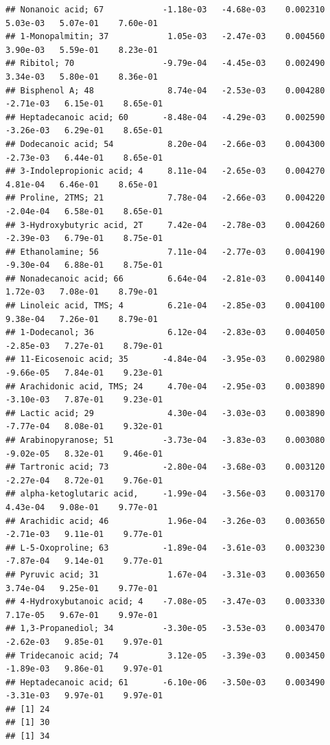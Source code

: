 \documentclass[]{article}
\begin{document}
\begin{verbatim}
## Nonanoic acid; 67            -1.18e-03   -4.68e-03    0.002310    5.03e-03   5.07e-01    7.60e-01
## 1-Monopalmitin; 37            1.05e-03   -2.47e-03    0.004560    3.90e-03   5.59e-01    8.23e-01
## Ribitol; 70                  -9.79e-04   -4.45e-03    0.002490    3.34e-03   5.80e-01    8.36e-01
## Bisphenol A; 48               8.74e-04   -2.53e-03    0.004280   -2.71e-03   6.15e-01    8.65e-01
## Heptadecanoic acid; 60       -8.48e-04   -4.29e-03    0.002590   -3.26e-03   6.29e-01    8.65e-01
## Dodecanoic acid; 54           8.20e-04   -2.66e-03    0.004300   -2.73e-03   6.44e-01    8.65e-01
## 3-Indolepropionic acid; 4     8.11e-04   -2.65e-03    0.004270    4.81e-04   6.46e-01    8.65e-01
## Proline, 2TMS; 21             7.78e-04   -2.66e-03    0.004220   -2.04e-04   6.58e-01    8.65e-01
## 3-Hydroxybutyric acid, 2T     7.42e-04   -2.78e-03    0.004260   -2.39e-03   6.79e-01    8.75e-01
## Ethanolamine; 56              7.11e-04   -2.77e-03    0.004190   -9.30e-04   6.88e-01    8.75e-01
## Nonadecanoic acid; 66         6.64e-04   -2.81e-03    0.004140    1.72e-03   7.08e-01    8.79e-01
## Linoleic acid, TMS; 4         6.21e-04   -2.85e-03    0.004100    9.38e-04   7.26e-01    8.79e-01
## 1-Dodecanol; 36               6.12e-04   -2.83e-03    0.004050   -2.85e-03   7.27e-01    8.79e-01
## 11-Eicosenoic acid; 35       -4.84e-04   -3.95e-03    0.002980   -9.66e-05   7.84e-01    9.23e-01
## Arachidonic acid, TMS; 24     4.70e-04   -2.95e-03    0.003890   -3.10e-03   7.87e-01    9.23e-01
## Lactic acid; 29               4.30e-04   -3.03e-03    0.003890   -7.77e-04   8.08e-01    9.32e-01
## Arabinopyranose; 51          -3.73e-04   -3.83e-03    0.003080   -9.02e-05   8.32e-01    9.46e-01
## Tartronic acid; 73           -2.80e-04   -3.68e-03    0.003120   -2.27e-04   8.72e-01    9.76e-01
## alpha-ketoglutaric acid,     -1.99e-04   -3.56e-03    0.003170    4.43e-04   9.08e-01    9.77e-01
## Arachidic acid; 46            1.96e-04   -3.26e-03    0.003650   -2.71e-03   9.11e-01    9.77e-01
## L-5-Oxoproline; 63           -1.89e-04   -3.61e-03    0.003230   -7.87e-04   9.14e-01    9.77e-01
## Pyruvic acid; 31              1.67e-04   -3.31e-03    0.003650    3.74e-04   9.25e-01    9.77e-01
## 4-Hydroxybutanoic acid; 4    -7.08e-05   -3.47e-03    0.003330    7.17e-05   9.67e-01    9.97e-01
## 1,3-Propanediol; 34          -3.30e-05   -3.53e-03    0.003470   -2.62e-03   9.85e-01    9.97e-01
## Tridecanoic acid; 74          3.12e-05   -3.39e-03    0.003450   -1.89e-03   9.86e-01    9.97e-01
## Heptadecanoic acid; 61       -6.10e-06   -3.50e-03    0.003490   -3.31e-03   9.97e-01    9.97e-01
## [1] 24
## [1] 30
## [1] 34
\end{verbatim}
\end{document}
